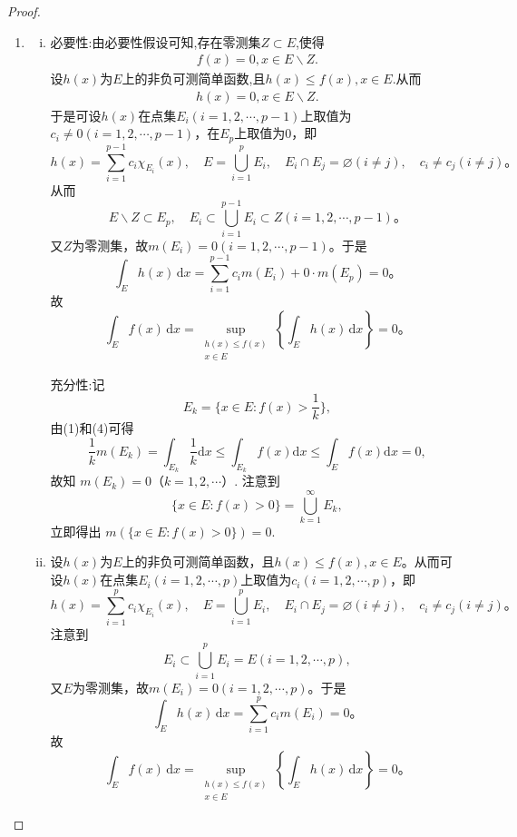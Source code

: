 \documentclass[../../main.tex]{subfiles}%
\begin{document}
\begin{proof}
\begin{enumerate}[(1)]
\item \begin{enumerate}[(i)]
\item {\heiti 必要性:}由必要性假设可知,存在零测集$Z\subset E$,使得
\begin{align*}
f(x)=0,x\in E\backslash Z.
\end{align*}
设$h(x)$为$E$上的非负可测简单函数,且$h(x)\leqslant f(x),x\in E$.从而
\begin{align*}
h(x)=0,x\in E\backslash Z.
\end{align*}
于是可设$h(x)$在点集$E_i (i = 1,2,\cdots,p-1)$上取值为$c_i\ne 0 (i = 1,2,\cdots,p-1)$，在$E_p$上取值为$0$，即
\[
h(x) = \sum_{i=1}^{p-1} c_i \chi_{E_i}(x),\quad E = \bigcup_{i=1}^p E_i,\quad E_i \cap E_j = \varnothing (i \ne j),\quad c_i \ne c_j (i \ne j)。
\]
从而
\[
E\backslash Z \subset E_p,\quad E_i \subset \bigcup_{i=1}^{p-1} E_i \subset Z (i = 1,2,\cdots,p-1)。
\]
又$Z$为零测集，故$m(E_i) = 0 (i = 1,2,\cdots,p-1)$。于是
\[
\int_E h(x)\,\mathrm{d}x = \sum_{i=1}^{p-1} c_i m(E_i) + 0 \cdot m(E_p) = 0。
\]
故
\[
\int_E f(x)\,\mathrm{d}x = \sup_{\substack{h(x) \leqslant f(x) \\ x \in E}} \left\{ \int_E h(x)\,\mathrm{d}x \right\} = 0。
\]

{\heiti 充分性:}记
\[E_k=\{x\in E:f(x)>\frac{1}{k}\},\]
由(1)和(4)可得
\[\frac{1}{k}m(E_k)=\int_{E_k}\frac{1}{k}\mathrm{d}x\leqslant \int_{E_k}f(x)\mathrm{d}x\leqslant \int_{E}f(x)\mathrm{d}x = 0,\]
故知 \(m(E_k)=0\)（\(k = 1,2,\cdots\)）. 注意到
\[\{x\in E:f(x)>0\}=\bigcup_{k = 1}^{\infty}E_k,\]
立即得出 \(m(\{x\in E:f(x)>0\}) = 0\).

\item 设$h(x)$为$E$上的非负可测简单函数，且$h(x) \leqslant f(x), x\in E$。从而可设$h(x)$在点集$E_i (i = 1,2,\cdots,p)$上取值为$c_i (i = 1,2,\cdots,p)$，即
\[
h(x) = \sum_{i=1}^p c_i \chi_{E_i}(x),\quad E = \bigcup_{i=1}^p E_i,\quad E_i \cap E_j = \varnothing (i \ne j),\quad c_i \ne c_j (i \ne j)。
\]
注意到
\[
E_i \subset \bigcup_{i=1}^p E_i = E (i = 1,2,\cdots,p),
\]
又$E$为零测集，故$m(E_i) = 0 (i = 1,2,\cdots,p)$。于是
\[
\int_E h(x)\,\mathrm{d}x = \sum_{i=1}^p c_i m(E_i) = 0。
\]
故
\[
\int_E f(x)\,\mathrm{d}x = \sup_{\substack{h(x) \leqslant f(x) \\ x \in E}} \left\{ \int_E h(x)\,\mathrm{d}x \right\} = 0。
\]
\end{enumerate}
\end{enumerate} 

\end{proof}
\end{document}
